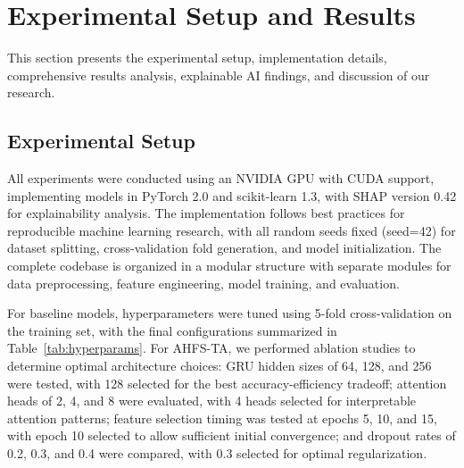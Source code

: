 \documentclass[journal]{IEEEtran}
\begin{document}
\section{Experimental Setup and Results}

This section presents the experimental setup, implementation details, comprehensive results analysis, explainable AI findings, and discussion of our research.

\subsection{Experimental Setup}

All experiments were conducted using an NVIDIA GPU with CUDA support, implementing models in PyTorch 2.0 and scikit-learn 1.3, with SHAP version 0.42 for explainability analysis. The implementation follows best practices for reproducible machine learning research, with all random seeds fixed (seed=42) for dataset splitting, cross-validation fold generation, and model initialization. The complete codebase is organized in a modular structure with separate modules for data preprocessing, feature engineering, model training, and evaluation.

For baseline models, hyperparameters were tuned using 5-fold cross-validation on the training set, with the final configurations summarized in Table~\ref{tab:hyperparams}. For AHFS-TA, we performed ablation studies to determine optimal architecture choices: GRU hidden sizes of 64, 128, and 256 were tested, with 128 selected for the best accuracy-efficiency tradeoff; attention heads of 2, 4, and 8 were evaluated, with 4 heads selected for interpretable attention patterns; feature selection timing was tested at epochs 5, 10, and 15, with epoch 10 selected to allow sufficient initial convergence; and dropout rates of 0.2, 0.3, and 0.4 were compared, with 0.3 selected for optimal regularization.
\end{document}
